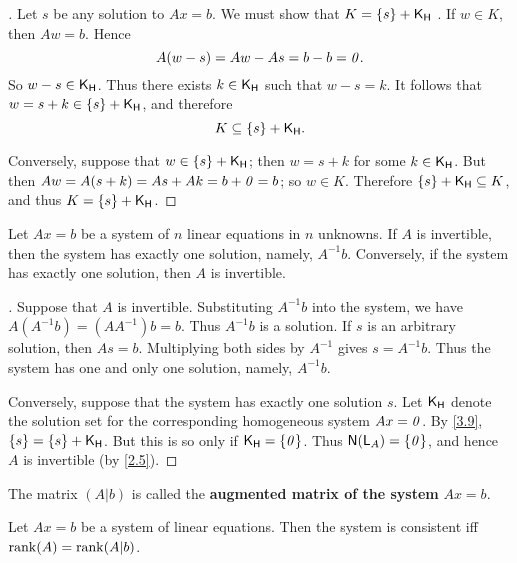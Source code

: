 \begin{proof}[]
  Let \(s\) be any solution to \(Ax = b\).
  We must show that \(K = \left\lbrace s\right\rbrace + \mathsf{K}_{\mathsf{H}}\) .
  If \(w \in K\), then \(Aw = b\).
  Hence
  \[
    A(w - s) = Aw - As = b - b = \mathit{0}.
  \]
  So \(w - s \in \mathsf{K}_{\mathsf{H}}\).
  Thus there exists \(k \in \mathsf{K}_{\mathsf{H}}\) such that \(w - s = k\).
  It follows that \(w = s + k \in \left\lbrace s\right\rbrace + \mathsf{K}_{\mathsf{H}}\), and therefore
  \[
    K \subseteq \left\lbrace s\right\rbrace + \mathsf{K}_{\mathsf{H}}.
  \]

  Conversely, suppose that \(w \in \left\lbrace s\right\rbrace + \mathsf{K}_{\mathsf{H}}\);
  then \(w = s + k\) for some \(k \in \mathsf{K}_{\mathsf{H}}\).
  But then \(Aw = A(s + k) = As + Ak = b + \mathit{0} = b\);
  so \(w \in K\).
  Therefore \(\left\lbrace s\right\rbrace + \mathsf{K}_{\mathsf{H}} \subseteq K\), and thus \(K = \left\lbrace s\right\rbrace + \mathsf{K}_{\mathsf{H}}\).
\end{proof}

\begin{thm}\label{3.10}
  Let \(Ax = b\) be a system of \(n\) linear equations in \(n\) unknowns.
  If \(A\) is invertible, then the system has exactly one solution, namely, \(A^{-1} b\).
  Conversely, if the system has exactly one solution, then \(A\) is invertible.
\end{thm}

\begin{proof}[]
  Suppose that \(A\) is invertible.
  Substituting \(A^{-1} b\) into the system, we have \(A (A^{-1} b) = (A A^{-1}) b = b\).
  Thus \(A^{-1} b\) is a solution.
  If \(s\) is an arbitrary solution, then \(As = b\).
  Multiplying both sides by \(A^{-1}\) gives \(s = A^{-1} b\).
  Thus the system has one and only one solution, namely, \(A^{-1} b\).

  Conversely, suppose that the system has exactly one solution \(s\).
  Let \(\mathsf{K}_{\mathsf{H}}\) denote the solution set for the corresponding homogeneous system \(Ax = \mathit{0}\).
  By \cref{3.9}, \(\left\lbrace s\right\rbrace = \left\lbrace s\right\rbrace + \mathsf{K}_{\mathsf{H}}\).
  But this is so only if \(\mathsf{K}_{\mathsf{H}} = \left\lbrace\mathit{0}\right\rbrace\).
  Thus \(\ns{\L_A} = \set{\zv}\), and hence \(A\) is invertible (by \cref{2.5}).
\end{proof}

\begin{defn}\label{3.3.5}
  The matrix \((A | b)\) is called the \textbf{augmented matrix of the system} \(Ax = b\).
\end{defn}

\begin{thm}\label{3.11}
  Let \(Ax = b\) be a system of linear equations.
  Then the system is consistent iff \(\rk{A} = \rk{A | b}\).
\end{thm}

